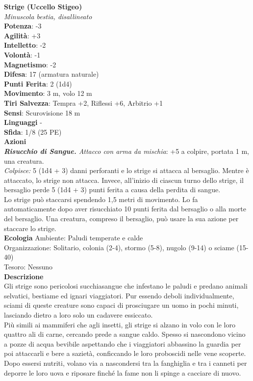 \begin{multicols}{2}
\medskip\textbf{Strige (Uccello Stigeo)}\\
\emph{Minuscola bestia, disallineato}\\
\textbf{Potenza}: -3\\
\textbf{Agilità}: +3\\
\textbf{Intelletto}: -2\\
\textbf{Volontà}: -1\\
\textbf{Magnetismo}: -2\\
\textbf{Difesa}: 17 (armatura naturale)\\
\textbf{Punti Ferita}: 2 (1d4)\\
\textbf{Movimento}: 3 m, volo 12 m\\
\textbf{Tiri Salvezza}: Tempra +2, Riflessi +6, Arbitrio +1\\
\textbf{Sensi}: Scurovisione 18 m\\
\textbf{Linguaggi} -\\
\textbf{Sfida}: 1/8 (25 PE)\smallskip\\
\smallskip\textbf{Azioni}\\
\emph{\textbf{Risucchio di Sangue.} Attacco con arma da mischia}: +5 a colpire, portata 1 m, una creatura.\\
\emph{Colpisce:} 5 (1d4 + 3) danni perforanti e lo strige si attacca al bersaglio. Mentre è attaccato, lo strige non attacca. Invece, all'inizio di ciascun turno dello strige, il bersaglio perde 5 (1d4 + 3) punti ferita a causa della perdita di sangue.\\
Lo strige può staccarsi spendendo 1,5 metri di movimento. Lo fa automaticamente dopo aver risucchiato 10 punti ferita dal bersaglio o alla morte del bersaglio. Una creatura, compreso il bersaglio, può usare la sua azione per staccare lo strige.\\
\textbf{Ecologia}
Ambiente: Paludi temperate e calde\\
Organizzazione: Solitario, colonia (2-4), stormo (5-8), nugolo (9-14) o sciame (15-40)\\
Tesoro: Nessuno\\
\textbf{Descrizione}\\
Gli strige sono pericolosi succhiasangue che infestano le paludi e predano animali selvatici, bestiame ed ignari viaggiatori. Pur essendo deboli individualmente, sciami di queste creature sono capaci di prosciugare un uomo in pochi minuti, lasciando dietro a loro solo un cadavere essiccato.\\

Più simili ai mammiferi che agli insetti, gli strige si alzano in volo con le loro quattro ali di carne, cercando prede a sangue caldo. Spesso si nascondono vicino a pozze di acqua bevibile aspettando che i viaggiatori abbassino la guardia per poi attaccarli e bere a sazietà, conficcando le loro proboscidi nelle vene scoperte. Dopo essersi nutriti, volano via a nascondersi tra la fanghiglia e tra i canneti per deporre le loro uova e riposare finché la fame non li spinge a cacciare di nuovo.\\


\end{multicols}
